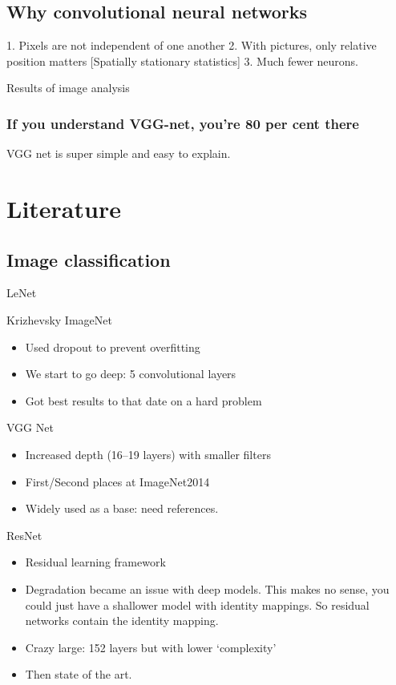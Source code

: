 \documentclass[12pt, a4paper, oneside, headinclude, footinclude]{article}
\begin{document}
\subsection{Why convolutional neural networks}

1. Pixels are not independent of one another
2. With pictures, only relative position matters [Spatially stationary
statistics]
3. Much fewer neurons.

Results of image analysis

\subsubsection{If you understand VGG-net, you're 80 per cent there}

VGG net is super simple and easy to explain.

\section{Literature}

\subsection{Image classification}

LeNet

Krizhevsky ImageNet~\cite{NIPS2012_4824}
\begin{itemize}
    \item Used dropout to prevent overfitting
    \item We start to go deep: 5 convolutional layers
    \item Got best results to that date on a hard problem
\end{itemize}


VGG Net~\cite{SimonyanZ14a}
\begin{itemize}
    \item Increased depth (16--19 layers) with smaller filters
    \item First/Second places at ImageNet2014
    \item Widely used as a base: need references.
\end{itemize}

ResNet~\cite{he2016deep}

\begin{itemize}
    \item Residual learning framework
    \item Degradation became an issue with deep models. This makes no sense,
        you could just have a shallower model with identity mappings. So
        residual networks contain the identity mapping.
    \item Crazy large: 152 layers but with lower `complexity'
    \item Then state of the art.
\end{itemize}
\end{document}
